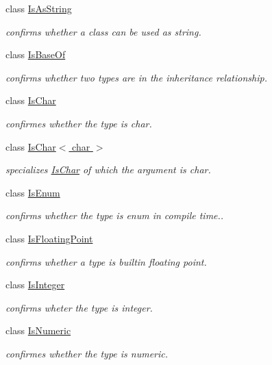 \begin{DoxyCompactItemize}
class \hyperlink{classhryky_1_1_is_as_string}{Is\-As\-String}
\begin{DoxyCompactList}\small\item\em confirms whether a class can be used as string. \end{DoxyCompactList}\item 
class \hyperlink{classhryky_1_1_is_base_of}{Is\-Base\-Of}
\begin{DoxyCompactList}\small\item\em confirms whether two types are in the inheritance relationship. \end{DoxyCompactList}\item 
class \hyperlink{classhryky_1_1_is_char}{Is\-Char}
\begin{DoxyCompactList}\small\item\em confirmes whether the type is char. \end{DoxyCompactList}\item 
class \hyperlink{classhryky_1_1_is_char_3_01char_01_4}{Is\-Char$<$ char $>$}
\begin{DoxyCompactList}\small\item\em specializes \hyperlink{classhryky_1_1_is_char}{Is\-Char} of which the argument is char. \end{DoxyCompactList}\item 
class \hyperlink{classhryky_1_1_is_enum}{Is\-Enum}
\begin{DoxyCompactList}\small\item\em confirms whether the type is enum in compile time.. \end{DoxyCompactList}\item 
class \hyperlink{classhryky_1_1_is_floating_point}{Is\-Floating\-Point}
\begin{DoxyCompactList}\small\item\em confirms whether a type is builtin floating point. \end{DoxyCompactList}\item 
class \hyperlink{classhryky_1_1_is_integer}{Is\-Integer}
\begin{DoxyCompactList}\small\item\em confirms wheter the type is integer. \end{DoxyCompactList}\item 
class \hyperlink{classhryky_1_1_is_numeric}{Is\-Numeric}
\begin{DoxyCompactList}\small\item\em confirmes whether the type is numeric. \end{DoxyCompactList}\item 

\end{DoxyCompactItemize}
